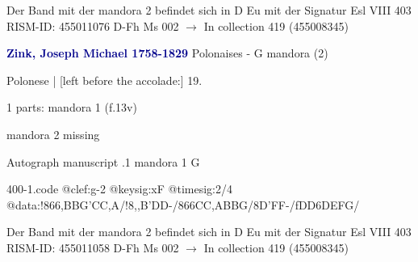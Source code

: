 \documentclass[twocolumn]{book}
\begin{document}
\newline Der Band mit der mandora 2 befindet sich in D Eu mit der Signatur Esl VIII 403
\newline RISM-ID: 455011076
\newline D-Fh  Ms 002
\newline $\rightarrow$ In collection 419 (455008345)
      
\newline \par \vspace{7pt} \textcolor{darkblue}{\textbf{Zink, Joseph Michael  1758-1829}}
\newline Polonaises - G
\newline mandora (2)
\newline \begin{itshape}[f.13v, at left:] Polonese | [left before the accolade:] 19.\end{itshape} 
\newline \textcolor{darkblue}{}  1 parts: mandora 1  (f.13v)
\newline \begin{small} mandora 2 missing\end{small} 
\newline Autograph manuscript
.1  mandora 1  G  
\begin{filecontents*}{400-1.code}
@clef:g-2
@keysig:xF
@timesig:2/4
@data:!866{,BBG}{'CC,A}/!8,,B'DD-/866{CC,A}{BBG}/8D'FF-/fDD6DEFG/
\end{filecontents*}
\newline
%

\newline Der Band mit der mandora 2 befindet sich in D Eu mit der Signatur Esl VIII 403
\newline RISM-ID: 455011058
\newline D-Fh  Ms 002
\newline $\rightarrow$ In collection 419 (455008345)
      
\end{document}
